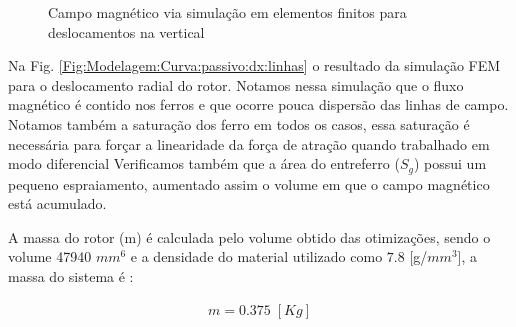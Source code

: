 \begin{figure}[!ht]
	\centering
		\label{Fig:Modelagem:Curva:passivo:dy:linhas:0}
		\label{Fig:Modelagem:Curva:passivo:dy:linhas:1,2}
	\caption{Campo magnético via simulação em elementos finitos para deslocamentos na vertical}
	\label{Fig:Modelagem:Curva:passivo:dy:linhas}
\end{figure}

Na Fig. \ref{Fig:Modelagem:Curva:passivo:dx:linhas} o resultado da simulação FEM para o deslocamento radial do rotor. Notamos nessa simulação que o fluxo magnético é contido nos ferros e que ocorre pouca dispersão das linhas de campo. Notamos também a saturação dos ferro em todos os casos, essa saturação é necessária para forçar a linearidade da força de atração quando trabalhado em modo diferencial Verificamos também que a área do entreferro ($S_g$) possui um pequeno espraiamento, aumentado assim o volume em que o campo magnético está acumulado. 

A massa do rotor (m) é calculada pelo volume obtido das otimizações, sendo o volume 47940 $mm^6$ e a densidade do material utilizado como $7.8$ [g/$mm^3$], a massa do sistema é :

\begin{align}
	m = 0.375 \; [Kg]
	\label{eq:massa}
\end{align}


